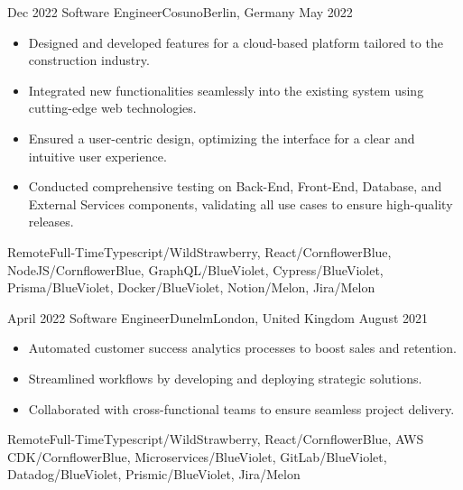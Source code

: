 \begin{experiences}
  \emptySeparator

  \experience
  {Dec 2022} {Software Engineer}{Cosuno}{Berlin, Germany}
  {May 2022}{\begin{itemize}
    \item Designed and developed features for a cloud-based platform tailored to the construction industry.
    \item Integrated new functionalities seamlessly into the existing system using cutting-edge web technologies.
    \item Ensured a user-centric design, optimizing the interface for a clear and intuitive user experience.
    \item Conducted comprehensive testing on Back-End, Front-End, Database, and External Services components, validating all use cases to ensure high-quality releases.
  \end{itemize}}
  {Remote}{Full-Time}{Typescript/WildStrawberry, React/CornflowerBlue, NodeJS/CornflowerBlue, GraphQL/BlueViolet, Cypress/BlueViolet, Prisma/BlueViolet, Docker/BlueViolet, Notion/Melon, Jira/Melon}

  \emptySeparator

  \experience
  {April 2022} {Software Engineer}{Dunelm}{London, United Kingdom}
  {August 2021}{\begin{itemize}
    \item Automated customer success analytics processes to boost sales and retention.
    \item Streamlined workflows by developing and deploying strategic solutions.
    \item Collaborated with cross-functional teams to ensure seamless project delivery.
  \end{itemize}}
  {Remote}{Full-Time}{Typescript/WildStrawberry, React/CornflowerBlue, AWS CDK/CornflowerBlue, Microservices/BlueViolet, GitLab/BlueViolet, Datadog/BlueViolet, Prismic/BlueViolet, Jira/Melon}

\end{experiences}